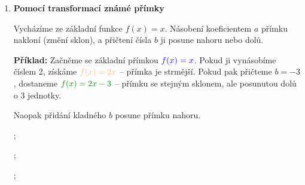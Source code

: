 \documentclass[12pt,a4paper]{article}
\begin{document}
\begin{enumerate}[label=\arabic*.]
Na levém obrázku jsou vyznačeny dva body zjištěné podle směrnice \(a\) a posunu \(b\).  
Na pravém obrázku vidíme výslednou přímku, která těmito body prochází.  
Tento postup je rychlý a přehledný – zejména pokud známe rovnice více lineárních funkcí a chceme je navzájem porovnat.

\medskip

\item \textbf{Pomocí transformací známé přímky}

Vycházíme ze základní funkce \(f(x) = x\).  
Násobení koeficientem \(a\) přímku nakloní (změní sklon),  
a přičtení čísla \(b\) ji posune nahoru nebo dolů.

\begin{examplebox}
\textbf{Příklad:}  
Začněme se základní přímkou \(\textcolor{blue}{f(x)=x}\).  
Pokud ji vynásobíme číslem 2, získáme \(\textcolor{pastelorange}{f(x)=2x}\) – přímka je strmější.  
Pokud pak přičteme \(b=-3\), dostaneme \(\textcolor{green!50!black}{f(x)=2x-3}\) –  
přímku se stejným sklonem, ale posunutou dolů o 3 jednotky.


Naopak přidání kladného \(b\) posune přímku nahoru.


\begin{center}
    \begin{minipage}[t]{0.32\textwidth}
        \centering
        \begin{axisgraph}[
            grid=none,
            xmin=-3, xmax=3,
            ymin=-4, ymax=4,
            title={$f(x)=x$},
            axis lines=middle,
            width=\linewidth,
            height=5.5cm,
            domain=-3:3,
            samples=2
        ]
            ;
        \end{axisgraph}
    \end{minipage}\hfill
    \begin{minipage}[t]{0.32\textwidth}
        \centering
        \begin{axisgraph}[
            grid=none,
            xmin=-3, xmax=3,
            ymin=-4, ymax=4,
            title={$f(x)=2x$},
            axis lines=middle,
            width=\linewidth,
            height=5.5cm,
            domain=-3:3,
            samples=2
        ]
            ;
        \end{axisgraph}
    \end{minipage}\hfill
    \begin{minipage}[t]{0.32\textwidth}
        \centering
        \begin{axisgraph}[
            grid=none,
            xmin=-3, xmax=3,
            ymin=-4, ymax=4,
            title={$f(x)=2x-3$},
            axis lines=middle,
            width=\linewidth,
            height=5.5cm,
            domain=-3:3,
            samples=2
        ]
            ;
        \end{axisgraph}
    \end{minipage}
\end{center}
\end{examplebox}

\end{enumerate}
\end{document}
